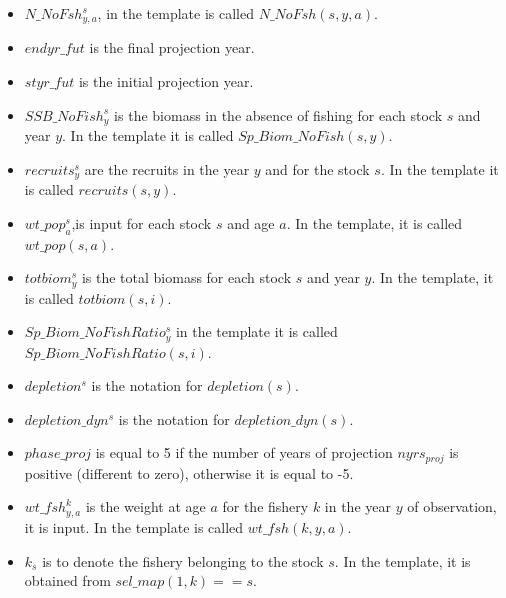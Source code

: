 \documentclass{article}
\begin{document}
\begin{itemize}
    
    \item $N\_NoFsh^s_{y,a}$, 
 in the template is called  $N\_NoFsh(s,y,a)$.
    \item $endyr\_fut$ is the final projection year.
    \item $styr\_fut$ is the initial projection year.
    
    \item $SSB\_NoFish^s_y$ is the biomass in the absence of fishing 
 for each stock $s$ and year $y$. In the template it is called $Sp\_Biom\_NoFish(s,y)$.
    
    \item $recruits^s_y$ are the recruits in the year $y$ and for the stock $s$. In the template it is called $recruits(s,y)$.
    \item $wt\_pop^s_a$,is input for each stock $s$ and age $a$. In the template, it is called  $wt\_pop(s,a)$.
    \item $totbiom^s_y$ is the total biomass for each stock $s$ and year $y$. In the template, it is called $totbiom(s,i)$.
    \item $Sp\_Biom\_NoFishRatio^s_y$ in the template it is called $Sp\_Biom\_NoFishRatio(s,i)$.
    \item $depletion^s$ is the notation for $depletion(s)$.
    \item $depletion\_dyn^s$ is the notation for $depletion\_dyn(s) $.
    \item $phase\_proj$ is equal to 5 if the number of years of projection $nyrs_{proj}$ is positive (different to zero), otherwise it is equal to -5.
    \item $wt\_fsh^{k}_{y,a}$ is the weight at age $a$ for the fishery $k$ in the year $y$ of observation, it is input. In the template is called $wt\_fsh(k,y,a)$.
    \item $k_s$ is to denote the fishery belonging to the stock $s$. In the template, it is obtained from $sel\_map(1,k) == s$.
    

\end{itemize}
\end{document}
